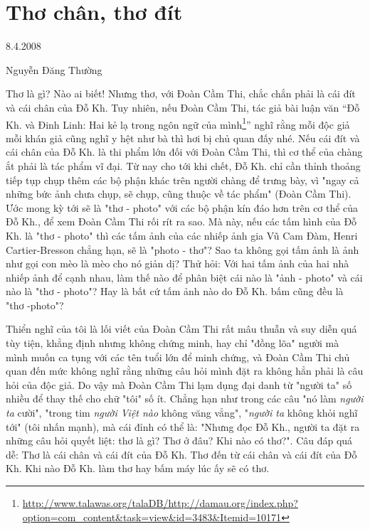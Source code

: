 \documentclass[../main.tex]{subfiles}
\begin{document}
\chapter{Thơ chân, thơ đít}

\begin{metadata}

\begin{flushright}8.4.2008\end{flushright}

Nguyễn Đăng Thường



\end{metadata}

\begin{multicols}{2}

Thơ là gì? Nào ai biết! Nhưng thơ, với Đoàn Cầm Thi, chắc chắn phải là cái đít và cái chân của Đỗ Kh. Tuy nhiên, nếu Đoàn Cầm Thi, tác giả bài luận văn “Đỗ Kh. và Đinh Linh: Hai kẻ lạ trong ngôn ngữ của mình\footnote{\url{http://www.talawas.org/talaDB/http://damau.org/index.php?option=com_content&task=view&id=3483&Itemid=10171}}” nghĩ rằng mỗi độc giả mỗi khán giả cũng nghĩ y hệt như bà thì hơi bị chủ quan đấy nhé. 
Nếu cái đít và cái chân của Đỗ Kh. là thi phẩm lớn đối với Đoàn Cầm Thi, thì cơ thể của chàng ắt phải là tác phẩm vĩ đại. Từ nay cho tới khi chết, Đỗ Kh. chỉ cần thỉnh thoảng tiếp tụp chụp thêm các bộ phận khác trên người chàng để trưng bày, vì "ngay cả những bức ảnh chưa chụp, sẽ chụp, cũng thuộc về tác phẩm" (Đoàn Cầm Thi). Ước mong kỳ tới sẽ là "thơ - photo" với các bộ phận kín đáo hơn trên cơ thể của Đỗ Kh., để xem Đoàn Cầm Thi rối rít ra sao. Mà này, nếu các tấm hình của Đỗ Kh. là "thơ - photo" thì các tấm ảnh của các nhiếp ảnh gia Vũ Cam Đàm, Henri Cartier-Bresson chẳng hạn, sẽ là "photo - thơ"? Sao ta không gọi tấm ảnh là ảnh như gọi con mèo là mèo cho nó giản dị? Thử hỏi: Với hai tấm ảnh của hai nhà nhiếp ảnh để cạnh nhau, làm thế nào để phân biệt cái nào là "ảnh - photo" và cái nào là "thơ - photo"? Hay là bất cứ tấm ảnh nào do Đỗ Kh. bấm cũng đều là "thơ -photo"? 
 
Thiển nghĩ của tôi là lối viết của Đoàn Cầm Thi rất mâu thuẫn và suy diễn quá tùy tiện, khẳng định nhưng không chứng minh, hay chỉ "đồng lõa" người mà mình muốn ca tụng với các tên tuổi lớn để minh chứng, và Đoàn Cầm Thi chủ quan đến mức không nghĩ rằng những câu hỏi mình đặt ra không hẳn phải là câu hỏi của độc giả. Do vậy mà Đoàn Cầm Thi lạm dụng đại danh từ "người ta" số nhiều để thay thế cho chữ "tôi" số ít. Chẳng hạn như trong các câu "nó làm \textit{người ta} cười", "trong tim \textit{người Việt nào} không văng vẳng", "\textit{người ta} không khỏi nghĩ tới" (tôi nhấn mạnh), mà cái đỉnh có thể là: "Nhưng đọc Đỗ Kh., người ta đặt ra những câu hỏi quyết liệt: thơ là gì? Thơ ở đâu? Khi nào có thơ?". Câu đáp quá dễ: Thơ là cái chân và cái đít của Đỗ Kh. Thơ đến từ cái chân và cái đít của Đỗ Kh. Khi nào Đỗ Kh. làm thơ hay bấm máy lúc ấy sẽ có thơ.  
 

\end{multicols}
\end{document}
